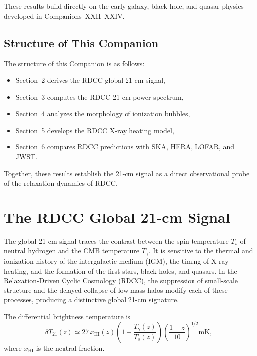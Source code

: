 \documentclass[11pt,a4paper]{article}
\begin{document}
These results build directly on the early-galaxy, black hole, and quasar physics developed in
Companions~XXII–XXIV.

\subsection{Structure of This Companion}

The structure of this Companion is as follows:
\begin{itemize}
\item Section~2 derives the RDCC global 21-cm signal,
\item Section~3 computes the RDCC 21-cm power spectrum,
\item Section~4 analyzes the morphology of ionization bubbles,
\item Section~5 develops the RDCC X-ray heating model,
\item Section~6 compares RDCC predictions with SKA, HERA, LOFAR, and JWST.
\end{itemize}

Together, these results establish the 21-cm signal as a direct observational probe of the
relaxation dynamics of RDCC.

\section{The RDCC Global 21-cm Signal}

The global 21-cm signal traces the contrast between the spin temperature $T_{s}$ of neutral
hydrogen and the CMB temperature $T_{\gamma}$. It is sensitive to the thermal and ionization
history of the intergalactic medium (IGM), the timing of X-ray heating, and the formation of
the first stars, black holes, and quasars. In the Relaxation-Driven Cyclic Cosmology (RDCC),
the suppression of small-scale structure and the delayed collapse of low-mass halos modify
each of these processes, producing a distinctive global 21-cm signature.

The differential brightness temperature is
\begin{equation}
\delta T_{21}(z)
\simeq
27\,x_{\mathrm{HI}}(z)
\left(1 - \frac{T_{\gamma}(z)}{T_{s}(z)}\right)
\left(\frac{1+z}{10}\right)^{1/2}
\mathrm{mK},
\end{equation}
where $x_{\mathrm{HI}}$ is the neutral fraction.
\end{document}
